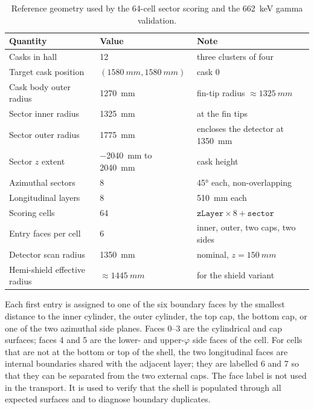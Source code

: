 \documentclass[11pt,a4paper]{article}
\begin{document}
\begin{table}[t]
  \centering
  \caption{Reference geometry used by the 64-cell sector scoring and the
  \SI{662}{keV} gamma validation.}
  \label{tab:geometry}
  \begin{tabular}{@{}lll@{}}
    \toprule
    Quantity & Value & Note \\
    \midrule
    Casks in hall & 12 & three clusters of four \\
    Target cask position & $(\SI{1580}{mm},\SI{1580}{mm})$ & cask 0 \\
    Cask body outer radius & \SI{1270}{mm} & fin-tip radius $\approx\SI{1325}{mm}$ \\
    Sector inner radius & \SI{1325}{mm} & at the fin tips \\
    Sector outer radius & \SI{1775}{mm} & encloses the detector at \SI{1350}{mm} \\
    Sector $z$ extent & \SI{-2040}{mm} to \SI{+2040}{mm} & cask height \\
    Azimuthal sectors & 8 & \ang{45} each, non-overlapping \\
    Longitudinal layers & 8 & \SI{510}{mm} each \\
    Scoring cells & 64 & $\texttt{zLayer}\times 8+\texttt{sector}$ \\
    Entry faces per cell & 6 & inner, outer, two caps, two sides \\
    Detector scan radius & \SI{1350}{mm} & nominal, $z=\SI{150}{mm}$ \\
    Hemi-shield effective radius & $\approx\SI{1445}{mm}$ & for the shield variant \\
    \bottomrule
  \end{tabular}
\end{table}

Each first entry is assigned to one of the six boundary faces by the smallest
distance to the inner cylinder, the outer cylinder, the top cap, the bottom cap,
or one of the two azimuthal side planes. Faces 0--3 are the cylindrical and cap
surfaces; faces 4 and 5 are the lower- and upper-$\varphi$ side faces of the
cell. For cells that are not at the bottom or top of the shell, the two
longitudinal faces are internal boundaries shared with the adjacent layer; they
are labelled 6 and 7 so that they can be separated from the two external caps.
The face label is not used in the transport. It is used to verify that the shell
is populated through all expected surfaces and to diagnose boundary duplicates.
\end{document}
